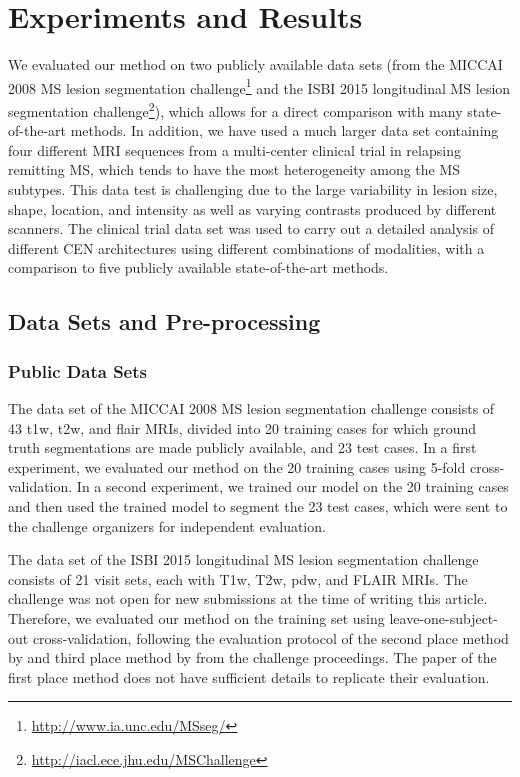
\section[Experiments and results]{Experiments and Results}

We evaluated our method on two publicly available data sets (from the MICCAI
2008 MS lesion segmentation
challenge\footnote{\url{http://www.ia.unc.edu/MSseg/}} and the ISBI 2015
longitudinal MS lesion segmentation
challenge\footnote{\url{http://iacl.ece.jhu.edu/MSChallenge}}), which allows for
a direct comparison with many state-of-the-art methods. In addition, we have
used a much larger data set containing four different MRI sequences from a
multi-center clinical trial in relapsing remitting MS, which tends to have the
most heterogeneity among the MS subtypes. This data test is challenging due to
the large variability in lesion size, shape, location, and intensity as well as
varying contrasts produced by different scanners. The clinical trial data set
was used to carry out a detailed analysis of different CEN architectures using
different combinations of modalities, with a comparison to five publicly
available state-of-the-art methods.

\subsection[Data sets and pre-processing]{Data Sets and Pre-processing}

\subsubsection{Public Data Sets}
The data set of the MICCAI 2008 MS lesion segmentation challenge
\citep{styner20083d} consists of 43 \gls{t1w}, \gls{t2w}, and
\gls{flair} MRIs, divided into 20 training cases for which ground truth
segmentations are made publicly available, and 23 test cases. In a first
experiment, we evaluated our method on the 20 training cases using 5-fold
cross-validation. In a second experiment, we trained our model on the 20
training cases and then used the trained model to segment the 23 test cases,
which were sent to the challenge organizers for independent evaluation.

The data set of the ISBI 2015 longitudinal MS lesion segmentation challenge
consists of 21 visit sets, each with T1w, T2w, \gls{pdw}, and FLAIR MRIs. The
challenge was not open for new submissions at the time of writing this article.
Therefore, we evaluated our method on the training set using
leave-one-subject-out cross-validation, following the evaluation protocol of the
second place method by \citet{jesson2015} and third place method by
\citet{maier2015} from the challenge proceedings. The paper of the first place
method does not have sufficient details to replicate their evaluation.

